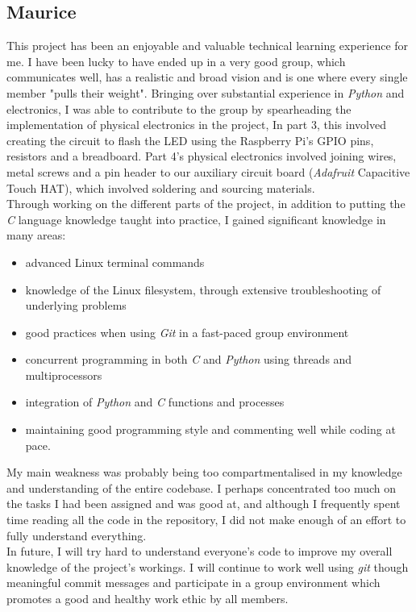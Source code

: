 \documentclass[11pt]{article}
\begin{document}
\subsection{Maurice}
This project has been an enjoyable and valuable technical learning experience for me. I have been lucky to have ended up in a very good group, which communicates well, has a realistic and broad vision and is one where every single member "pulls their weight". Bringing over substantial experience in \textit{Python} and electronics, I was able to contribute to the group by spearheading the implementation of physical electronics in the project, In part 3, this involved creating the circuit to flash the LED using the Raspberry Pi's GPIO pins, resistors and a breadboard. Part 4's physical electronics involved joining wires, metal screws and a pin header to our auxiliary circuit board (\textit{Adafruit} Capacitive Touch HAT), which involved soldering and sourcing materials.\\

Through working on the different parts of the project, in addition to putting the \textit{C} language knowledge taught into practice, I gained significant knowledge in many areas:
\begin{itemize}
\item advanced Linux terminal commands
\item knowledge of the Linux filesystem, through extensive troubleshooting of underlying problems
\item good practices when using \textit{Git} in a fast-paced group environment
\item concurrent programming in both \textit{C} and \textit{Python} using threads and multiprocessors
\item integration of \textit{Python} and \textit{C} functions and processes
\item maintaining good programming style and commenting well while coding at pace.
\end{itemize}

My main weakness was probably being too compartmentalised in my knowledge and understanding of the entire codebase. I perhaps concentrated too much on the tasks I had been assigned and was good at, and although I frequently spent time reading all the code in the repository, I did not make enough of an effort to fully understand everything.\\

In future, I will try hard to understand everyone's code to improve my overall knowledge of the project's workings. I will continue to work well using \textit{git} though meaningful commit messages and participate in a group environment which promotes a good and healthy work ethic by all members.
\end{document}
